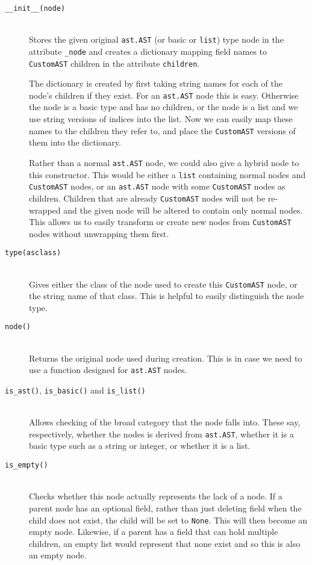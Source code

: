 \documentclass[twoside,a4paper]{report}
\begin{document}
\begin{description}
\item[\texttt{\_\_init\_\_(node)}] \hfill \\
Stores the given original \texttt{ast.AST} (or basic or \texttt{list}) type node in the attribute \texttt{\_node} and creates a dictionary mapping field names
to \texttt{CustomAST} children in the attribute \texttt{children}.

The dictionary is created by first taking string names for each of the node's children if they exist. For an \texttt{ast.AST} node this is easy.
Otherwise the node is a basic type and has no children, or the node is a list and we use string versions of indices into the list. Now we can
easily map these names to the children they refer to, and place the \texttt{CustomAST} versions of them into the dictionary.

Rather than a normal \texttt{ast.AST} node, we could also give a hybrid node to this constructor. This would be either a \texttt{list} containing normal
nodes and \texttt{CustomAST} nodes, or an
\texttt{ast.AST} node with some \texttt{CustomAST} nodes as children. Children that are already \texttt{CustomAST} nodes will not be re-wrapped
and the given node will be altered to contain only normal nodes. This allows us to easily transform or create new nodes from \texttt{CustomAST}
nodes without unwrapping them first.

\item[\texttt{type(asclass)}] \hfill \\
Gives either the class of the node used to create this \texttt{CustomAST} node, or the string name of that class. This is helpful to easily distinguish
the node type.

\item[\texttt{node()}] \hfill \\
Returns the original node used during creation. This is in case we need to use a function designed for \texttt{ast.AST} nodes.

\item[\texttt{is\_ast()}, \texttt{is\_basic()} and \texttt{is\_list()}] \hfill \\
Allows checking of the broad category that the node falls into. These say, respectively, whether the nodes is derived from \texttt{ast.AST}, whether
it is a basic type such as a string or integer, or whether it is a list.

\item[\texttt{is\_empty()}] \hfill \\
Checks whether this node actually represents the lack of a node. If a parent node has an optional field, rather than just deleting field when the child does
not exist, the child will be set to \texttt{None}. This will then become an empty node. Likewise, if a parent has a field that can hold multiple children, an
empty list would represent that none exist and so this is also an empty node.


\end{description}
\end{document}
